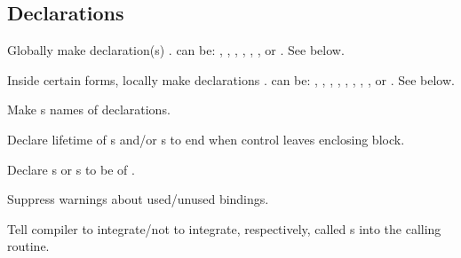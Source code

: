 \subsection{Declarations}
\begin{LIST}{1cm}

  {
  Globally make declaration(s) .  can be:
  ,      
  ,
  ,           
  ,   
  ,
  , or
  .
  See below.
  }

  {
  Inside certain forms, locally make declarations .  can be:
  ,
  ,
  ,           
  ,       
  ,     
  ,     
  ,  
  , or
  .
  See below.      
  }

  \begin{LIST}{.5cm}
    
    {
    Make s names of declarations.
   }
 
    {
    Declare lifetime of s and/or s to end
    when control leaves enclosing block.
  }


    {
    Declare s or s to be of .
  }

    {
    Suppress warnings about used/unused bindings.
  }

    {
    Tell compiler to integrate/not to integrate, respectively, called
    s into the calling routine.
  }


\end{LIST}
\end{LIST}
